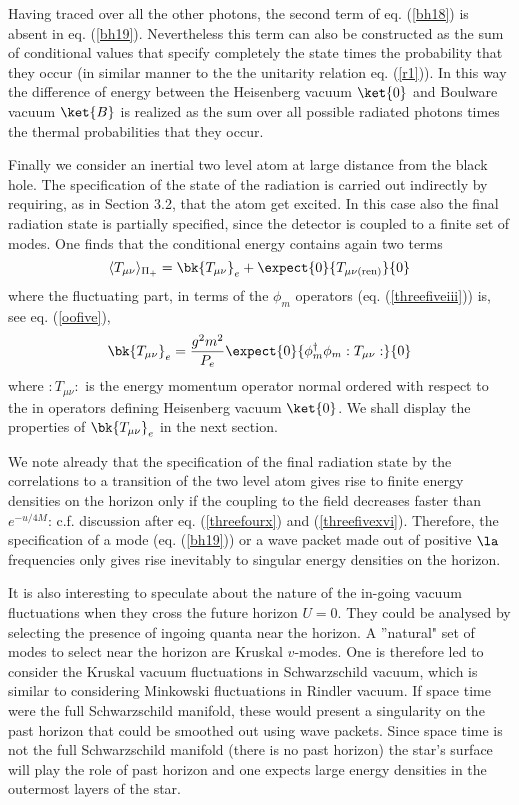 \documentclass[12pt]{article}
\begin{document}
Having traced over all
the other photons, the second term of eq. (\ref{bh18}) is absent in
eq. (\ref{bh19}). Nevertheless this term can also be constructed as the sum of
conditional values that
specify completely the state times the probability that they occur
 (in similar manner to the
 the unitarity relation eq. (\ref{r1})).
 In this way the difference of
energy between the Heisenberg vacuum $\ket{0}$ and
Boulware vacuum $\ket{B}$ is realized as the
sum over all possible radiated photons times the thermal probabilities that
they occur.

Finally we consider  an inertial
two level atom at large distance
from the black hole.
The specification of the state of the radiation is carried out indirectly by
requiring, as in Section 3.2, that the atom get excited.
In this case also the final radiation state is  partially
specified, since the detector is coupled to a finite set of modes.
One finds that the conditional energy contains again two terms
\begin{equation}\langle T_{\mu \nu }\rangle _{ \Pi_+} =
\bk{T_{\mu\nu}}_{e} + \expect{0}{T_{\mu
\nu
({\rm ren})} }{0}
\label{bhTmunu}
\end{equation}
where the fluctuating part, in terms of the $\phi_m$ operators (eq.
(\ref{threefiveiii}))
is, see eq. (\ref{oofive}),
\begin{equation}
\bk{T_{\mu\nu}}_{e}
= { g^2 m^2 \over P_{e}}
 \expect{0}{\phi_m^\dagger \phi_m
:T_{\mu\nu}: }{0}
\label{Tmunue}
\end{equation}
where $:T_{\mu\nu}:$ is the energy momentum operator normal ordered with
respect to the in operators defining Heisenberg vacuum $\ket{0}$.
We shall display the properties of $\bk{T_{\mu\nu}}_{e}$
in the next section.

We note already that the specification of the final radiation state
by the correlations to a transition of the two
level atom
gives rise to finite energy densities on the horizon only
if the coupling to the field decreases faster than $e^{-u/4M}$:
c.f. discussion after eq.
(\ref{threefourx})
and (\ref{threefivexvi}). Therefore, the
specification of a mode (eq. (\ref{bh19})) or a wave packet made out of
positive $\la$ frequencies only gives rise inevitably to
singular energy densities on the horizon.

It is
also
interesting to speculate
about the
nature of the in-going vacuum fluctuations when they cross the future horizon
$U=0$. They could be analysed by
selecting the presence of ingoing quanta near the horizon.
A ''natural" set of
 modes to select near the horizon are Kruskal $v$-modes. One is
therefore led to consider the Kruskal vacuum fluctuations in Schwarzschild
vacuum, which is similar to considering Minkowski fluctuations in Rindler
vacuum. If space time were the full Schwarzschild manifold, these would
present a singularity on the past horizon that could be smoothed out using
wave packets. Since space time is not the full
Schwarzschild manifold (there is no past horizon)
the star's surface
will play the role of past
horizon and one expects large energy densities
in the outermost layers of the star.
\end{document}
